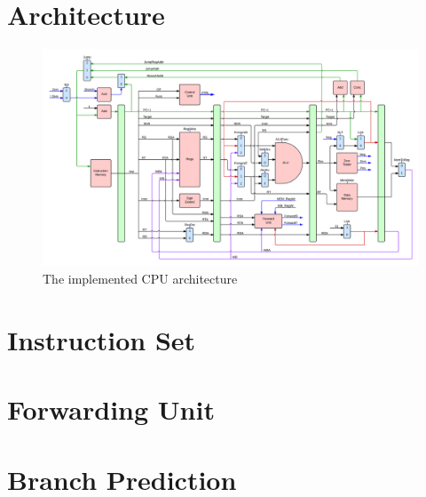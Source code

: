 \section{Architecture}

\begin{figure}[ht]
    \centering
    \includegraphics[scale=0.11]{figures/Architecture.png}
    \caption{\label{fig:cpuArchitecture}The implemented CPU architecture} 
\end{figure}

\section{Instruction Set}

\section{Forwarding Unit}

\section{Branch Prediction}

